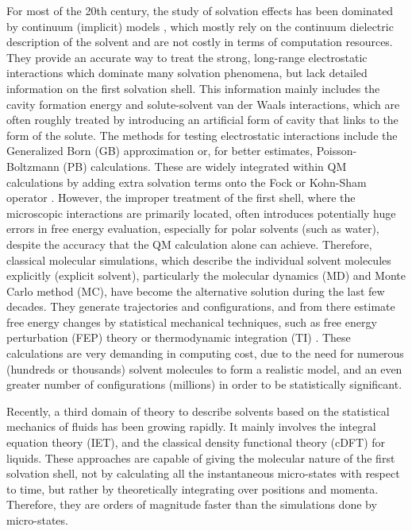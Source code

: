 For most of the 20th century, the study of solvation effects has been
dominated by continuum (implicit) models \citep{Jensen,Cramer_1999},
which mostly rely on the continuum dielectric description of the solvent
and are not costly in terms of computation resources. They provide
an accurate way to treat the strong, long-range electrostatic interactions
which dominate many solvation phenomena, but lack detailed information
on the first solvation shell. This information mainly includes the
cavity formation energy and solute-solvent van der Waals interactions,
which are often roughly treated by introducing an artificial form
of cavity that links to the form of the solute. The methods for testing
electrostatic interactions include the Generalized Born (GB) approximation
or, for better estimates, Poisson-Boltzmann (PB) calculations. These
are widely integrated within \acs{QM} calculations by adding extra
solvation terms onto the Fock or Kohn-Sham operator \citep{Tomasi_1994_implicit_model,tomasi_quantum_2005}.
However, the improper treatment of the first shell, where the microscopic
interactions are primarily located, often introduces potentially huge
errors in free energy evaluation, especially for polar solvents (such
as water), despite the accuracy that the \acs{QM} calculation alone
can achieve. Therefore, classical molecular simulations, which describe
the individual solvent molecules explicitly (explicit solvent), particularly
the molecular dynamics (\acs{MD}) and Monte Carlo method (\acs{MC}),
have become the alternative solution during the last few decades.
They generate trajectories and configurations, and from there estimate
free energy changes by statistical mechanical techniques, such as
free energy perturbation (FEP) theory or thermodynamic integration
(TI) \citep{Jorgensen_1995_MC}. These calculations are very demanding
in computing cost, due to the need for numerous (hundreds or thousands)
solvent molecules to form a realistic model, and an even greater number
of configurations (millions) in order to be statistically significant.

Recently, a third domain of theory to describe solvents based on the
statistical mechanics of fluids has been growing rapidly. It mainly
involves the integral equation theory (\acs{IET}), and the classical
density functional theory (c\acs{DFT}) for liquids. These approaches
are capable of giving the molecular nature of the first solvation
shell, not by calculating all the instantaneous micro-states with
respect to time, but rather by theoretically integrating over positions
and momenta. Therefore, they are orders of magnitude faster than the
simulations done by micro-states.

